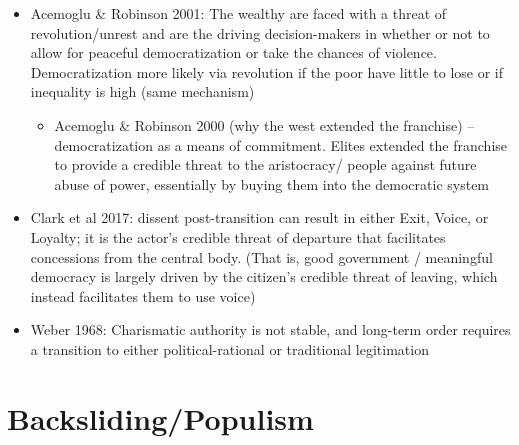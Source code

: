 \documentclass[12pt]{article}
\begin{document}
\begin{itemize}
    \item Acemoglu \& Robinson 2001: The wealthy are faced with a threat of revolution/unrest and are the driving decision-makers in whether or not to allow for peaceful democratization or take the chances of violence. Democratization more likely via revolution if the poor have little to lose or if inequality is high (same mechanism)
    \begin{itemize}
        \item Acemoglu \& Robinson 2000 (why the west extended the franchise) -- democratization as a means of commitment. Elites extended the franchise to provide a credible threat to the aristocracy/ people against future abuse of power, essentially by buying them into the democratic system
    \end{itemize}
    \item Clark et al 2017: dissent post-transition can result in either Exit, Voice, or Loyalty; it is the actor's credible threat of departure that facilitates concessions from the central body. (That is, good government / meaningful democracy is largely driven by the citizen's credible threat of leaving, which instead facilitates them to use voice)
    \item Weber 1968: Charismatic authority is not stable, and long-term order requires a transition to either political-rational or traditional legitimation
\end{itemize}





\section*{Backsliding/Populism}
\end{document}
